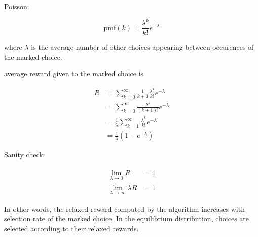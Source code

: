 \documentclass{article}
\begin{document}
Poisson:

\[\mathrm{pmf}(k) = \frac {\lambda^k} {k!} e^{-\lambda}\]

where $\lambda$ is the average number of other choices
appearing between occurences of the marked choice.

average reward given to the marked choice is

\begin{align}
	 \overline R & =  \sum_{k=0}^\infty \frac 1 {k+1} \frac {\lambda^k} {k!} e^{-\lambda} \\
				 & = \sum_{k=0}^\infty \frac {\lambda^k} {(k+1)!} e^{-\lambda} \\
		         & = \frac 1 \lambda \sum_{k=1}^\infty \frac {\lambda^k} {k!} e^{-\lambda} \\
	             & = \frac 1 \lambda \left(1 - e^{-\lambda}\right)
\end{align}

Sanity check:

\begin{align}
	\lim_{\lambda \to 0} \overline R & = 1 \\
	\lim_{\lambda \to \infty} \lambda {\overline R}  & = 1 
 \end{align}

In other words, the relaxed reward computed by the algorithm increases
with selection rate of the marked choice. In the equilibrium distribution,
choices are selected according to their relaxed rewards.
\end{document}
